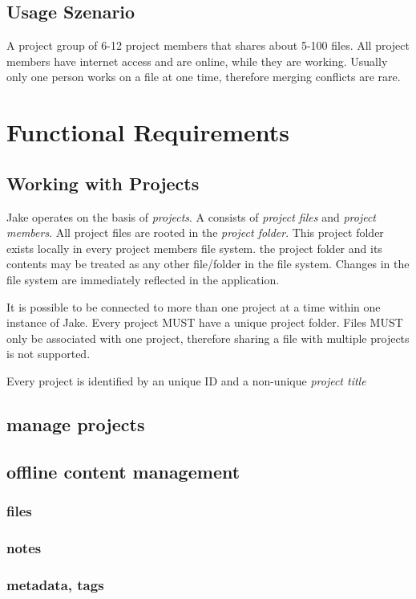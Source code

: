 \documentclass[english,a4paper,12pt]{report}
\begin{document}
\subsection{Usage Szenario}
A project group of 6-12 project members that shares about 5-100 files. All project members have internet access and are online, while they are working. Usually only one person works on a file at one time, therefore merging conflicts are rare. 

\section{Functional Requirements}
\subsection{Working with Projects }
Jake operates on the basis of \emph{projects}. A consists of \emph{project files} and \emph{project members}. All project files are rooted in the \emph{project folder}. This project folder exists locally in every project members file system. the project folder and its contents may be treated as any other file/folder in the file system. Changes in the file system are immediately reflected in the application.

It is possible to be connected to more than one project at a time within one instance of Jake. Every project MUST have a unique project folder. Files MUST only be associated with one project, therefore sharing a file with multiple projects is not supported.

Every project is identified by an unique ID and a non-unique \emph{project title}

\subsection{manage projects}
\subsection{offline content management}
\subsubsection{files}
\subsubsection{notes}
\subsubsection{metadata, tags}
\end{document}
